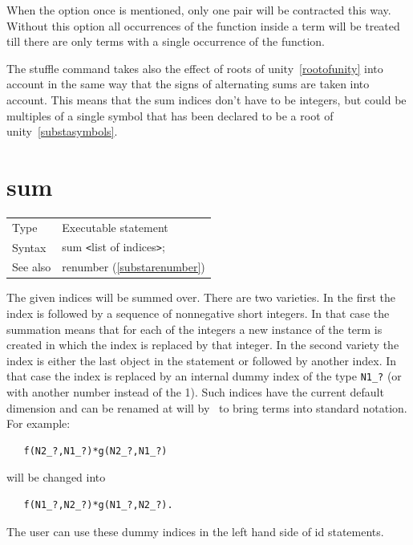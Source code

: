 When the option once is mentioned, only one pair will be contracted this 
way. Without this option all occurrences of the function inside a term will 
be treated till there are only terms with a single occurrence of the 
function.

The stuffle command takes also the effect of roots of 
unity~\ref{rootofunity} into account in the same way 
that the signs of alternating sums are taken into account. This means that 
the sum indices don't have to be integers, but could be multiples of a 
single symbol that has been declared to be a root of 
unity~\ref{substasymbols}.
\vspace{10mm}
%

\section{sum}
\label{substasum}

\noindent \begin{tabular}{ll}
Type & Executable statement\\
Syntax & sum {\tt<}list of indices{\tt>};
\\ See also & renumber (\ref{substarenumber})
\end{tabular}\vspace{4mm}

\noindent The given indices will be summed over. There are two 
varieties. In the first the index is followed by a sequence of nonnegative 
short integers. In that case the summation means that for each of the 
integers a new instance of the term is created in which the index is 
replaced by that integer. In the second variety the index is either the 
last object in the statement or followed by another index. In that case the 
index is replaced by an internal dummy 
index of the type \verb:N1_?: (or with another number 
instead of the 1). Such indices have the current
default dimension and can 
be renamed at will by \FORM\ to bring terms into standard notation. For 
example:
\begin{verbatim}
   f(N2_?,N1_?)*g(N2_?,N1_?)
\end{verbatim}
will be changed into
\begin{verbatim}
   f(N1_?,N2_?)*g(N1_?,N2_?).
\end{verbatim}
The user can use these dummy indices in the left hand side of 
id statements.
\vspace{10mm}

